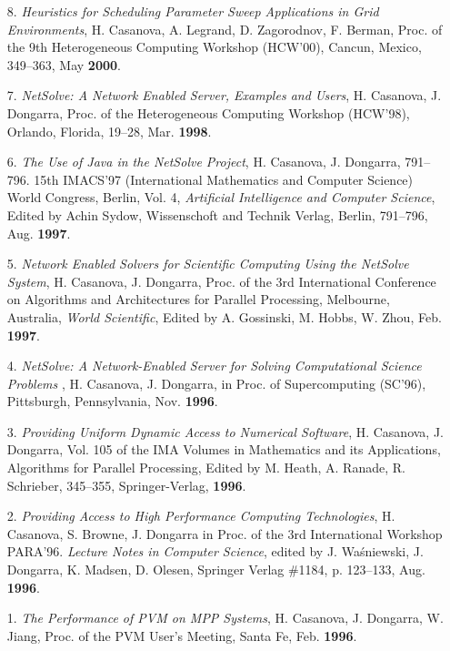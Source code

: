 \begin{enumerate}
\item [8.]
{\it Heuristics for Scheduling Parameter Sweep Applications in Grid
Environments}, H. Casanova, A. Legrand, D. Zagorodnov, F. Berman,
Proc. of the 9th Heterogeneous Computing Workshop (HCW'00), Cancun,
Mexico, 349--363, May {\bf 2000}.

\item[7.]
{\it NetSolve: A Network Enabled Server, Examples and Users}, H. Casanova,
J. Dongarra, Proc. of the Heterogeneous Computing Workshop (HCW'98),
Orlando, Florida, 19--28, Mar. {\bf 1998}.

\item[6.]
{\it The Use of Java in the NetSolve Project}, H. Casanova, J. Dongarra,
791--796.  15th IMACS'97 (International Mathematics and Computer Science)
World Congress, Berlin, Vol. 4, \emph{Artificial Intelligence and Computer
Science}, Edited by Achin Sydow, Wissenschoft and Technik Verlag, Berlin,
791--796, Aug. {\bf 1997}.

\item[5.]
{\it Network Enabled Solvers for Scientific Computing Using the NetSolve
System}, H. Casanova, J. Dongarra, Proc. of the 3rd International
Conference on Algorithms and Architectures for Parallel Processing,
Melbourne, Australia, \emph{World Scientific}, Edited by A. Gossinski,
M. Hobbs, W. Zhou, Feb. {\bf 1997}.

\item[4.]
{\it NetSolve: A Network-Enabled Server for Solving Computational
Science Problems }, H. Casanova, J. Dongarra, in Proc.
of Supercomputing (SC'96), Pittsburgh, Pennsylvania, Nov. {\bf 1996}.


\item[3.]
{\it Providing Uniform Dynamic Access to Numerical Software}, H. Casanova,
J. Dongarra, Vol. 105 of the IMA Volumes in Mathematics and its
Applications, Algorithms for Parallel Processing, Edited by M. Heath,
A. Ranade, R. Schrieber, 345--355, Springer-Verlag, {\bf 1996}.

\item[2.]
{\it Providing Access to High Performance Computing Technologies},
H. Casanova, S. Browne, J. Dongarra in Proc. of the 3rd
International Workshop PARA'96. \emph{Lecture Notes in Computer Science},
edited by J. Wa\'sniewski, J. Dongarra, K. Madsen, D. Olesen, Springer
Verlag \#1184, p. 123--133, Aug. {\bf 1996}.

\item[1.]
{\it The Performance of PVM on MPP Systems}, H. Casanova, J. Dongarra,
W. Jiang, Proc. of the PVM User's Meeting, Santa Fe, Feb.
{\bf 1996}.

\end{enumerate}


